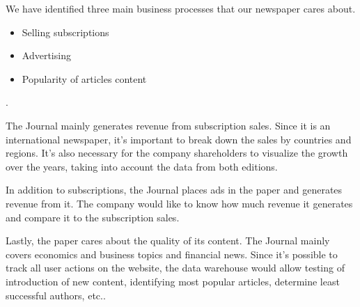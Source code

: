  
We have identified three main business processes that our newspaper cares about.
\begin{itemize}
    \item Selling subscriptions
    \item Advertising
    \item Popularity of articles content 
\end{itemize} .

The Journal mainly generates revenue from subscription sales. 
Since it is an international newspaper, it's important to break down the sales by countries and regions. It's also necessary for the company shareholders to visualize the growth over the years, taking into account the data from both editions.

In addition to subscriptions, the Journal places ads in the paper and generates revenue from it. The company would like to know how much revenue it generates and compare it to the subscription sales.

Lastly, the paper cares about the quality of its content. The Journal mainly covers economics and business topics and financial news. Since it's possible to track all user actions on the website, the data warehouse would allow testing of introduction of new content, identifying most popular articles, determine least successful authors, etc..



